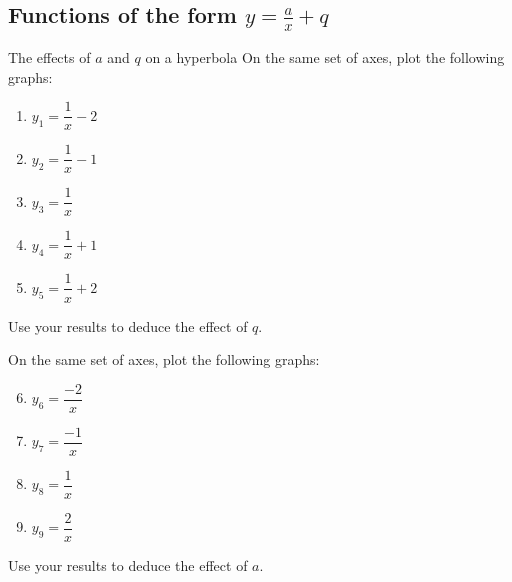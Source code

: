 \subsection*{Functions of the form $y=\frac{a}{x}+q$}
\begin{Investigation}{The effects of $a$ and $q$ on a hyperbola}
  On the same set of axes, plot the following graphs:
  \begin{enumerate}[itemsep=3pt, label=\textbf{\arabic*}. ] 
  \item $y_1=\dfrac{1}{x}-2$
  \item $y_2=\dfrac{1}{x}-1$
  \item $y_3=\dfrac{1}{x}$
  \item $y_4=\dfrac{1}{x}+1$
  \item $y_5=\dfrac{1}{x}+2$
  \end{enumerate}
Use your results to deduce the effect of $q$.\\
\par
On the same set of axes, plot the following graphs:
\begin{enumerate}[itemsep=3pt, label=\textbf{\arabic*}. ] \setcounter{enumi}{5}
\item $y_6=\dfrac{-2}{x}$
\item $y_7=\dfrac{-1}{x}$
\item $y_8=\dfrac{1}{x}$
\item $y_9=\dfrac{2}{x}$
\end{enumerate}
\par
Use your results to deduce the effect of $a$.
\end{Investigation}

